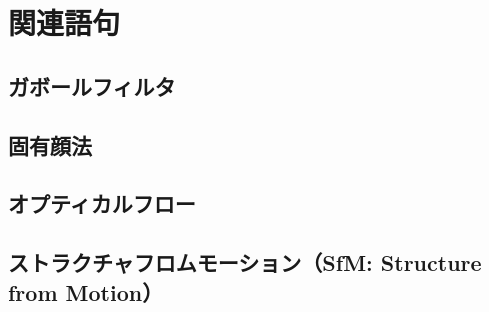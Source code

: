 \chapter{関連語句}
\section{ガボールフィルタ}
\section{固有顔法}
\section{オプティカルフロー}
\section{ストラクチャフロムモーション（SfM: Structure from Motion）}